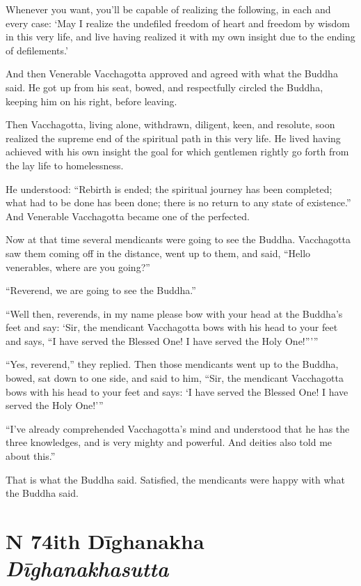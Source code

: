 \documentclass[12pt,openany]{book}%
\newcommand*{\suttatitleacronym}[1]{\smaller[2]{#1}\vspace*{.3em}}
\newcommand*{\suttatitletranslation}[1]{\linebreak{#1}}
\newcommand*{\suttatitleroot}[1]{\linebreak\smaller[2]\itshape{#1}}
\newcommand*{\tocacronym}[1]{\hspace*{-3.3em}{#1}\quad}
\newcommand*{\toctranslation}[1]{#1}
\newcommand*{\tocroot}[1]{(\textit{#1})}
\begin{document}
Whenever you want, you’ll be capable of realizing the following, in each and every case: ‘May I realize the undefiled freedom of heart and freedom by wisdom in this very life, and live having realized it with my own insight due to the ending of defilements.’ 

And then Venerable Vacchagotta approved and agreed with what the Buddha said. He got up from his seat, bowed, and respectfully circled the Buddha, keeping him on his right, before leaving. 

Then Vacchagotta, living alone, withdrawn, diligent, keen, and resolute, soon realized the supreme end of the spiritual path in this very life. He lived having achieved with his own insight the goal for which gentlemen rightly go forth from the lay life to homelessness. 

He understood: “Rebirth is ended; the spiritual journey has been completed; what had to be done has been done; there is no return to any state of existence.” And Venerable Vacchagotta became one of the perfected. 

Now at that time several mendicants were going to see the Buddha. Vacchagotta saw them coming off in the distance, went up to them, and said, “Hello venerables, where are you going?” 

“Reverend, we are going to see the Buddha.” 

“Well then, reverends, in my name please bow with your head at the Buddha’s feet and say: ‘Sir, the mendicant Vacchagotta bows with his head to your feet and says, “I have served the Blessed One! I have served the Holy One!”’” 

“Yes, reverend,” they replied. Then those mendicants went up to the Buddha, bowed, sat down to one side, and said to him, “Sir, the mendicant Vacchagotta bows with his head to your feet and says: ‘I have served the Blessed One! I have served the Holy One!’” 

“I’ve already comprehended Vacchagotta’s mind and understood that he has the three knowledges, and is very mighty and powerful. And deities also told me about this.” 

That is what the Buddha said. Satisfied, the mendicants were happy with what the Buddha said. 

%
\section*{{\suttatitleacronym MN 74}{\suttatitletranslation With Dīghanakha }{\suttatitleroot Dīghanakhasutta}}
\addcontentsline{toc}{section}{\tocacronym{MN 74} \toctranslation{With Dīghanakha } \tocroot{Dīghanakhasutta}}
\end{document}
